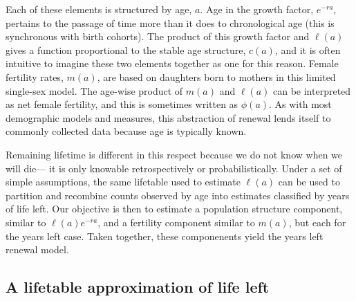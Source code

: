 \documentclass[12pt,oneside,a4paper,leqno]{article}
\begin{document}
Each of these elements is structured by
age, $a$. %
Age in the growth factor, $e^{-ra}$, pertains to the passage of
time more than it does to chronological age (this is synchronous with birth
cohorts). The product of this growth factor and $\ell(a)$ gives a
function proportional to the stable age structure, $c(a)$, and it is often
intuitive to imagine these two elements together as one for this reason. Female
fertility rates, $m(a)$, are based on daughters born to mothers in this limited
single-sex model.  The age-wise product of $m(a)$ and $\ell(a)$
can be interpreted as net female fertility, and this
is sometimes written as $\phi(a)$. As with most demographic models and
measures, this abstraction of renewal lends itself to
commonly collected data because age is typically known.

Remaining lifetime is different in this respect because we do not know when we
will die--- it is only knowable retrospectively or probabilistically. Under a set of simple assumptions, the same lifetable used to
estimate $\ell(a)$ can be used to
partition and recombine counts observed by age into estimates
classified by years of life left. Our objective is then to estimate a population
structure component, similar to $\ell(a)e^{-ra}$, and a fertility component
similar to $m(a)$, but each for the years left case. Taken together, these
componenents yield the years left renewal model.

\subsection*{A lifetable approximation of life left}
\end{document}
